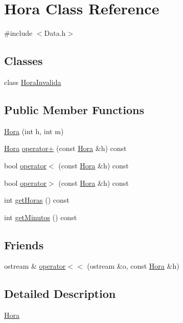 \hypertarget{class_hora}{}\section{Hora Class Reference}
\label{class_hora}


{\ttfamily \#include $<$Data.\+h$>$}

\subsection*{Classes}
\begin{DoxyCompactItemize}
\item 
class \hyperlink{class_hora_1_1_hora_invalida}{Hora\+Invalida}
\end{DoxyCompactItemize}
\subsection*{Public Member Functions}
\begin{DoxyCompactItemize}
\item 
\hyperlink{class_hora_acba1e481b72cf9af44cc3418b2db5d84}{Hora} (int h, int m)
\item 
\hyperlink{class_hora}{Hora} \hyperlink{class_hora_a4d20f25d9881fcf81572d5c6c6797afa}{operator+} (const \hyperlink{class_hora}{Hora} \&h) const 
\item 
bool \hyperlink{class_hora_a6640c1cebbbc73495ec36f0f1480ac35}{operator$<$} (const \hyperlink{class_hora}{Hora} \&h) const 
\item 
bool \hyperlink{class_hora_a837b9feb94fc55d8cd60a888185ee496}{operator$>$} (const \hyperlink{class_hora}{Hora} \&h) const 
\item 
int \hyperlink{class_hora_aa7fa11ebe86089fbb43d90e7ed432cb6}{get\+Horas} () const 
\item 
int \hyperlink{class_hora_afd7735ef6f6222904a77f22a8bbb80fd}{get\+Minutos} () const 
\end{DoxyCompactItemize}
\subsection*{Friends}
\begin{DoxyCompactItemize}
\item 
ostream \& \hyperlink{class_hora_a51fe201f7a8d2f4069b045da603fc7a1}{operator$<$$<$} (ostream \&o, const \hyperlink{class_hora}{Hora} \&h)
\end{DoxyCompactItemize}


\subsection{Detailed Description}
\hyperlink{class_hora}{Hora}

